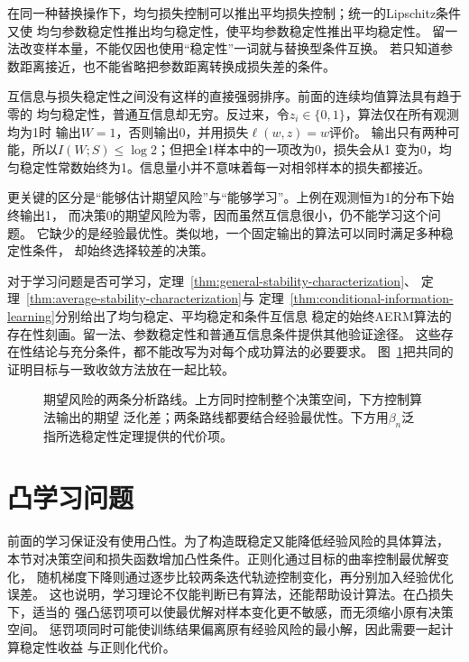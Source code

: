 在同一种替换操作下，均匀损失控制可以推出平均损失控制；统一的Lipschitz条件又使
均匀参数稳定性推出均匀稳定性，使平均参数稳定性推出平均稳定性。
留一法改变样本量，不能仅因也使用“稳定性”一词就与替换型条件互换。
若只知道参数距离接近，也不能省略把参数距离转换成损失差的条件。

互信息与损失稳定性之间没有这样的直接强弱排序。前面的连续均值算法具有趋于零的
均匀稳定性，普通互信息却无穷。反过来，令$z_i\in\{0,1\}$，算法仅在所有观测均为1时
输出$W=1$，否则输出0，并用损失$\ell(w,z)=w$评价。
输出只有两种可能，所以$I(W;S)\leq\log2$；但把全1样本中的一项改为0，损失会从1
变为0，均匀稳定性常数始终为1。信息量小并不意味着每一对相邻样本的损失都接近。

更关键的区分是“能够估计期望风险”与“能够学习”。上例在观测恒为1的分布下始终输出1，
而决策0的期望风险为零，因而虽然互信息很小，仍不能学习这个问题。
它缺少的是经验最优性。类似地，一个固定输出的算法可以同时满足多种稳定性条件，
却始终选择较差的决策。

对于学习问题是否可学习，定理~\ref{thm:general-stability-characterization}、
定理~\ref{thm:average-stability-characterization}与
定理~\ref{thm:conditional-information-learning}分别给出了均匀稳定、平均稳定和条件互信息
稳定的始终AERM算法的存在性刻画。留一法、参数稳定性和普通互信息条件提供其他验证途径。
这些存在性结论与充分条件，都不能改写为对每个成功算法的必要要求。
图~\ref{fig:learning-risk-routes}把共同的证明目标与一致收敛方法放在一起比较。

\begin{figure}[htbp]
 \centering
 
 \caption{期望风险的两条分析路线。上方同时控制整个决策空间，下方控制算法输出的期望
 泛化差；两条路线都要结合经验最优性。下方用$\beta_n$泛指所选稳定性定理提供的代价项。}
 \label{fig:learning-risk-routes}
\end{figure}

\FloatBarrier
\section{凸学习问题}
\label{sec:regularized-learning}
\label{sec:convex-learning-problem}

前面的学习保证没有使用凸性。为了构造既稳定又能降低经验风险的具体算法，
本节对决策空间和损失函数增加凸性条件。正则化通过目标的曲率控制最优解变化，
随机梯度下降则通过逐步比较两条迭代轨迹控制变化，再分别加入经验优化误差。
这也说明，学习理论不仅能判断已有算法，还能帮助设计算法。在凸损失下，适当的
强凸惩罚项可以使最优解对样本变化更不敏感，而无须缩小原有决策空间。
惩罚项同时可能使训练结果偏离原有经验风险的最小解，因此需要一起计算稳定性收益
与正则化代价。

